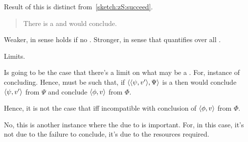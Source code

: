 \begin{note}
  Result of this is distinct from~\autoref{sketch:zS:succeed}.

  \begin{quote}
    There is a \curb{} and would conclude.
  \end{quote}

  Weaker, in sense holds if no \curb{}.
  Stronger, in sense that quantifies over all \curb{}.
\end{note}


\begin{note}
  Limits.

  Is going to be the case that there's a limit on what may be a \curb{}.
  For, instance of concluding.
  Hence, must be such that, if \(\langle \langle \psi, v' \rangle, \Psi \rangle\) is a \curb{} then would conclude \(\langle \psi, v' \rangle\) from \(\Psi\) and conclude \(\langle \phi, v \rangle\) from \(\Phi\).

  Hence, it is not the case that \curb{} iff incompatible with conclusion of \(\langle \phi, v \rangle\) from \(\Phi\).

  No, this is another instance where the due to is important.
  For, in this case, it's not due to the failure to conclude, it's due to the resources required.
\end{note}


